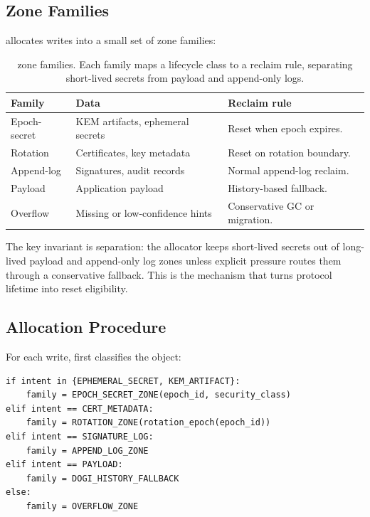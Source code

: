 \subsection{Zone Families}

\system allocates writes into a small set of zone families:

\begin{table}[t]
\centering
\caption{\system zone families.  Each family maps a lifecycle class to a reclaim rule, separating short-lived secrets from payload and append-only logs.}
\label{tab:zone-family}
\footnotesize
\begin{tabularx}{\columnwidth}{lYY}
\toprule
\textbf{Family} & \textbf{Data} & \textbf{Reclaim rule} \\
\midrule
Epoch-secret & KEM artifacts, ephemeral secrets & Reset when epoch expires. \\
Rotation & Certificates, key metadata & Reset on rotation boundary. \\
Append-log & Signatures, audit records & Normal append-log reclaim. \\
Payload & Application payload & History-based fallback. \\
Overflow & Missing or low-confidence hints & Conservative GC or migration. \\
\bottomrule
\end{tabularx}
\end{table}

The key invariant is separation: the allocator keeps short-lived secrets out of long-lived payload and append-only log zones unless explicit pressure routes them through a conservative fallback.  This is the mechanism that turns protocol lifetime into reset eligibility.

\subsection{Allocation Procedure}

For each write, \system first classifies the object:

\begin{lstlisting}[caption={Zone-family decision rule.},label={lst:alloc}]
if intent in {EPHEMERAL_SECRET, KEM_ARTIFACT}:
    family = EPOCH_SECRET_ZONE(epoch_id, security_class)
elif intent == CERT_METADATA:
    family = ROTATION_ZONE(rotation_epoch(epoch_id))
elif intent == SIGNATURE_LOG:
    family = APPEND_LOG_ZONE
elif intent == PAYLOAD:
    family = DOGI_HISTORY_FALLBACK
else:
    family = OVERFLOW_ZONE
\end{lstlisting}

